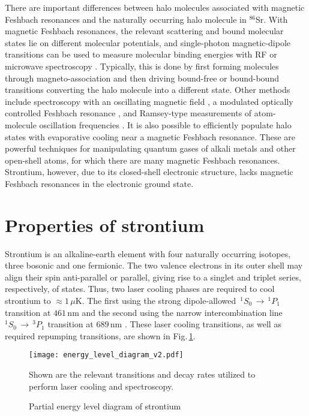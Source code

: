 There are important differences between halo molecules associated with magnetic Feshbach resonances and the naturally occurring halo molecule in $^{86}$Sr. 
With magnetic Feshbach resonances, the relevant scattering and bound molecular states lie on different molecular potentials, and single-photon magnetic-dipole transitions can be used to measure molecular binding energies with RF or microwave spectroscopy \cite{Chin2010,cju05,thw95b}. 
Typically, this is done by first forming molecules through magneto-association and then driving bound-free or bound-bound transitions converting the halo molecule into a different state. 
Other methods include spectroscopy with an oscillating magnetic field \cite{thw95b}, a modulated optically controlled Feshbach resonance \cite{chx15}, and Ramsey-type measurements of atom-molecule oscillation frequencies \cite{ckt03}. 
It is also possible to efficiently populate halo states with evaporative cooling \cite{jba03} near a magnetic Feshbach resonance. 
These are powerful techniques for manipulating quantum gases of alkali metals and other open-shell atoms, for which there are many magnetic Feshbach resonances. 
Strontium, however, due to its closed-shell electronic structure, lacks magnetic Feshbach resonances in the electronic ground state.

\section{Properties of strontium}
\label{sec:sr}
Strontium is an alkaline-earth element with four naturally occurring isotopes, three bosonic and one fermionic.
The two valence electrons in its outer shell may align their spin anti-parallel or parallel, giving rise to a singlet and triplet series, respectively, of states.
Thus, two laser cooling phases are required to cool strontium to $\approx\!1\,\mu$K.
The first using the strong dipole-allowed $\,^1S_0\,\rightarrow\,^1P_1$ transition at $461$\,nm and the second using the narrow intercombination line $^1S_0\,\rightarrow\,^3P_1$ transition at $689$\,nm \cite{Katori1999,Ido2000,Mukaiyama2003a,Loftus2004,Ciuryo2004,Nagel2005a,Mickelson2005}.
These laser cooling transitions, as well as required repumping transitions, are shown in Fig.\,\ref{fig:energyLevels}.
	\begin{figure} 
		\centerline{
		\texttt{[image: energy\_level\_diagram\_v2.pdf]}}
		\caption{Partial energy level diagram of strontium}{Shown are the relevant transitions and decay rates utilized to perform laser cooling and spectroscopy.}
		\label{fig:energyLevels}
	\end{figure}
	
